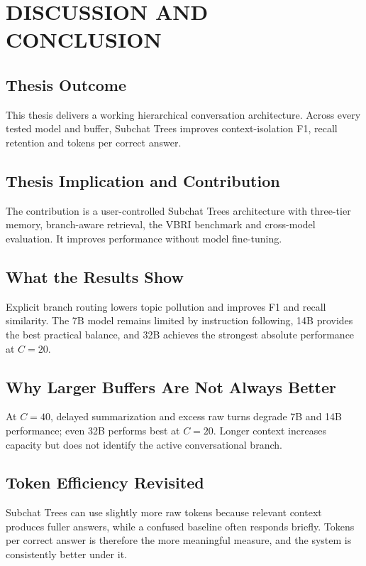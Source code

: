 \chapter{DISCUSSION AND CONCLUSION}\label{sec5}
\vspace{-3em}

\section{Thesis Outcome}
This thesis delivers a working hierarchical conversation architecture. Across every tested model and buffer, Subchat Trees improves context-isolation F1, recall retention and tokens per correct answer.

\section{Thesis Implication and Contribution}
The contribution is a user-controlled Subchat Trees architecture with three-tier memory, branch-aware retrieval, the VBRI benchmark and cross-model evaluation. It improves performance without model fine-tuning.

\section{What the Results Show}\label{subsec:discussion_results}

Explicit branch routing lowers topic pollution and improves F1 and recall similarity. The 7B model remains limited by instruction following, 14B provides the best practical balance, and 32B achieves the strongest absolute performance at $C=20$.

\section{Why Larger Buffers Are Not Always Better}\label{subsec:larger_buffers}

At $C=40$, delayed summarization and excess raw turns degrade 7B and 14B performance; even 32B performs best at $C=20$. Longer context increases capacity but does not identify the active conversational branch.

\section{Token Efficiency Revisited}\label{subsec:token_efficiency_revisited}

Subchat Trees can use slightly more raw tokens because relevant context produces fuller answers, while a confused baseline often responds briefly. Tokens per correct answer is therefore the more meaningful measure, and the system is consistently better under it.

